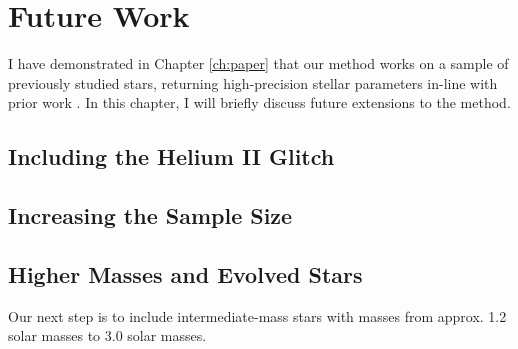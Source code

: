 \chapter{Future Work}\label{ch:future}

I have demonstrated in Chapter \ref{ch:paper} that our method works on a sample of previously studied stars, returning high-precision stellar parameters in-line with prior work \citep{Serenelli.Johnson.ea2017}. In this chapter, I will briefly discuss future extensions to the method.

\section{Including the Helium II Glitch}

\section{Increasing the Sample Size}

\section{Higher Masses and Evolved Stars}

Our next step is to include intermediate-mass stars with masses from approx. 1.2 solar masses to 3.0 solar masses.
